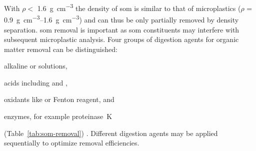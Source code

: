 With $\rho <$ \SI{1.6}{\gram\per\cubic\centi\meter} \citep{CerliSeparation2012} the density of \ac{som} is similar to that of microplastics ($\rho$ = \SIrange{0.9}{1.6}{\gram\per\cubic\centi\meter}) \citep{EndersEvaluation2020} and can thus be only partially removed by density separation. \Ac{som} removal is important as
\ac{som} constituents may interfere with subsequent microplastic analysis. Four groups of digestion agents for organic matter removal can be distinguished:
\begin{enumerate*}
	\item alkaline 	or  solutions,
	\item acids including  and ,
	\item oxidants like  or Fenton reagent, and
	\item enzymes, for example proteinase~K
\end{enumerate*}
(Table~\ref{tab:som-removal}) \citep{DehautMicroplastics2016}.
Different digestion agents may be applied sequentially to optimize removal efficiencies.

